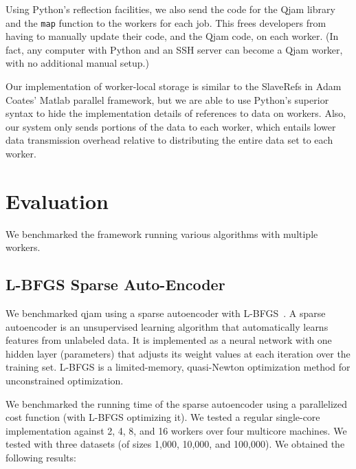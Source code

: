 \documentclass[%
  final,
  notitlepage,
  narroweqnarray,
  inline,
]{ieee}
\begin{document}
Using Python's reflection facilities, we also send the code for the Qjam
library and the {\tt map} function to the workers for each job. This frees
developers from having to manually update their code, and the Qjam code, on
each worker. (In fact, any computer with Python and an SSH server can become a
Qjam worker, with no additional manual setup.)

Our implementation of worker-local storage is similar to the SlaveRefs in Adam
Coates' Matlab parallel framework, but we are able to use Python's superior
syntax to hide the implementation details of references to data on
workers. Also, our system only sends portions of the data to each worker, which
entails lower data transmission overhead relative to distributing the entire
data set to each worker.



\section{Evaluation}

We benchmarked the framework running various algorithms with multiple workers.

\subsection{L-BFGS Sparse Auto-Encoder}

We benchmarked qjam using a sparse autoencoder with L-BFGS~\cite{lbfgs}. A
sparse autoencoder is an unsupervised learning algorithm that automatically
learns features from unlabeled data. It is implemented as a neural network with
one hidden layer (parameters) that adjusts its weight values at each iteration
over the training set. L-BFGS is a limited-memory, quasi-Newton optimization
method for unconstrained optimization.

We benchmarked the running time of the sparse autoencoder using a parallelized
cost function (with L-BFGS optimizing it). We tested a regular single-core
implementation against 2, 4, 8, and 16 workers over four multicore machines. We
tested with three datasets (of sizes 1,000, 10,000, and 100,000). We obtained
the following results:
\end{document}
